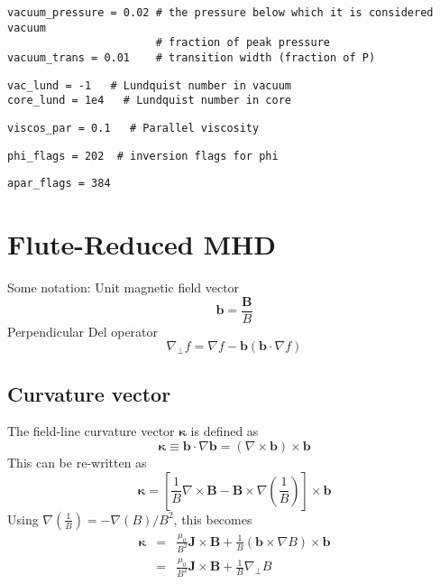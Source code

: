 \documentclass[12pt, a4paper]{article}
\newcommand{\Vec}[1]{\ensuremath{\mathbf{#1}}}
\newcommand{\Bvec}{\Vec{B}}
\newcommand{\Jvec}{\Vec{J}}
\newcommand{\Curl}[1]{\ensuremath{\nabla\times #1 }}
\begin{document}
\begin{verbatim}
vacuum_pressure = 0.02 # the pressure below which it is considered vacuum
                       # fraction of peak pressure
vacuum_trans = 0.01    # transition width (fraction of P)
\end{verbatim}

\begin{verbatim}
vac_lund = -1   # Lundquist number in vacuum
core_lund = 1e4   # Lundquist number in core
\end{verbatim}

\begin{verbatim}
viscos_par = 0.1   # Parallel viscosity
\end{verbatim}

\begin{verbatim}
phi_flags = 202  # inversion flags for phi
\end{verbatim}

\begin{verbatim}
apar_flags = 384
\end{verbatim}

\section{Flute-Reduced MHD}
\label{sec:equations}

Some notation:
Unit magnetic field vector
\[
\Vec{b} = \frac{\Bvec}{B}
\]
Perpendicular Del operator
\[
\nabla_\perp f = \nabla f - \Vec{b}\left(\Vec{b}\cdot\nabla f\right)
\]

\subsection{Curvature vector}

The field-line curvature vector $\Vec{\kappa}$ is defined as
\begin{equation}
\Vec{\kappa} \equiv \Vec{b}\cdot\nabla\Vec{b} = \left(\nabla\times\Vec{b}\right)\times\Vec{b}
\end{equation}
This can be re-written as
\[
\Vec{\kappa} = \left[\frac{1}{B}\Curl{\Bvec} - \Bvec\times\nabla\left(\frac{1}{B}\right)\right]\times\Vec{b}
\]
Using $\nabla\left(\frac{1}{B}\right) = -\nabla\left(B\right) / B^2$, this becomes
\begin{eqnarray}
\Vec{\kappa} &=& \frac{\mu_0}{B^2}\Jvec\times\Bvec + \frac{1}{B}\left(\Vec{b}\times\nabla B\right)\times\Vec{b} \nonumber \\
&=& \frac{\mu_0}{B^2}\Jvec\times\Bvec + \frac{1}{B}\nabla_\perp B \label{eq:kappajxb}
\end{eqnarray}
\end{document}
